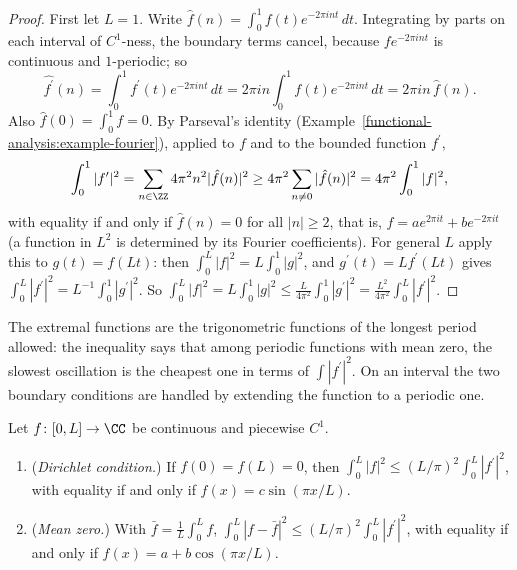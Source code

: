 \begin{proof}
First let $L = 1$. Write $\hat f(n) = \int_0^1f(t)e^{-2\pi int}\,dt$. Integrating by parts on each interval of $C^1$-ness, the boundary terms cancel, because $fe^{-2\pi int}$ is continuous and
$1$-periodic; so
\[
\widehat{f^{\prime}}(n) = \int_0^1f^{\prime}(t)e^{-2\pi int}\,dt = 2\pi in\int_0^1f(t)e^{-2\pi int}\,dt = 2\pi in\,\hat f(n).
\]
Also $\hat f(0) = \int_0^1f = 0$. By Parseval's identity (Example~\ref{functional-analysis:example-fourier}), applied to $f$ and to the bounded function $f^{\prime}$,
\[
\int_0^1|f^{\prime}|^2 = \sum_{n \in \ZZ}4\pi^2n^2|\hat f(n)|^2 \geq 4\pi^2\sum_{n \neq 0}|\hat f(n)|^2 = 4\pi^2\int_0^1|f|^2,
\]
with equality if and only if $\hat f(n) = 0$ for all $|n| \geq 2$, that is, $f = ae^{2\pi it} + be^{-2\pi it}$ (a function in $L^2$ is determined by its Fourier coefficients). For general $L$ apply
this to $g(t) = f(Lt)$: then $\int_0^L|f|^2 = L\int_0^1|g|^2$, and $g^{\prime}(t) = Lf^{\prime}(Lt)$ gives $\int_0^L|f^{\prime}|^2 = L^{-1}\int_0^1|g^{\prime}|^2$. So
$\int_0^L|f|^2 = L\int_0^1|g|^2 \leq \frac{L}{4\pi^2}\int_0^1|g^{\prime}|^2 = \frac{L^2}{4\pi^2}\int_0^L|f^{\prime}|^2$.
\end{proof}

The extremal functions are the trigonometric functions of the longest period allowed: the inequality says that among periodic functions with mean zero, the slowest oscillation is the cheapest one
in terms of $\int|f^{\prime}|^2$. On an interval the two boundary conditions are handled by extending the function to a periodic one.

\begin{corollary}\label{distributions:corollary-poincare-interval}
Let $f \colon [0, L] \to \CC$ be continuous and piecewise $C^1$.
\begin{enumerate}
\item (\emph{Dirichlet condition.}) If $f(0) = f(L) = 0$, then $\int_0^L|f|^2 \leq (L/\pi)^2\int_0^L|f^{\prime}|^2$, with equality if and only if $f(x) = c\sin(\pi x/L)$.
\item (\emph{Mean zero.}) With $\bar f = \frac1L\int_0^Lf$, $\int_0^L|f - \bar f|^2 \leq (L/\pi)^2\int_0^L|f^{\prime}|^2$, with equality if and only if $f(x) = a + b\cos(\pi x/L)$.
\end{enumerate}
\end{corollary}

